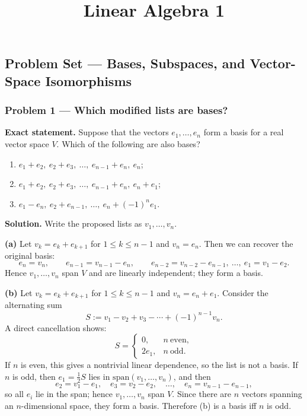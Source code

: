 \documentclass[12pt,a4paper]{article}
\title{Linear Algebra 1}
\author{}
\date{}
\theoremstyle{plain}
\theoremstyle{definition}      %
\begin{document}
	\maketitle

\subsection*{Problem Set — Bases, Subspaces, and Vector-Space Isomorphisms}

\subsubsection*{Problem 1 — Which modified lists are bases?}

\textbf{Exact statement.}
Suppose that the vectors $e_1,\dots,e_n$ form a basis for a real vector space $V$.
Which of the following are also bases?
\begin{enumerate}
	\item[(a)] $e_1+e_2,\ e_2+e_3,\ \dots,\ e_{n-1}+e_n,\ e_n$;
	\item[(b)] $e_1+e_2,\ e_2+e_3,\ \dots,\ e_{n-1}+e_n,\ e_n+e_1$;
	\item[(c)] $e_1-e_n,\ e_2+e_{n-1},\ \dots,\ e_n+(-1)^n e_1$.
\end{enumerate}

\textbf{Solution.}
Write the proposed lists as $v_1,\dots,v_n$.

\medskip
\noindent\textbf{(a)} Let $v_k=e_k+e_{k+1}$ for $1\le k\le n-1$ and $v_n=e_n$.
Then we can recover the original basis:
\[
e_n=v_n,\qquad
e_{n-1}=v_{n-1}-e_n,\qquad
e_{n-2}=v_{n-2}-e_{n-1},\ \dots,\ 
e_1=v_1-e_2.
\]
Hence $v_1,\dots,v_n$ span $V$ and are linearly independent; they form a basis.

\medskip
\noindent\textbf{(b)} Let $v_k=e_k+e_{k+1}$ for $1\le k\le n-1$ and $v_n=e_n+e_1$.
Consider the alternating sum
\[
S:=v_1-v_2+v_3-\cdots+(-1)^{n-1}v_n.
\]
A direct cancellation shows:
\[
S=
\begin{cases}
	0, & n\ \text{even},\\[4pt]
	2e_1, & n\ \text{odd}.
\end{cases}
\]
If $n$ is even, this gives a nontrivial linear dependence, so the list is not a basis.
If $n$ is odd, then $e_1=\tfrac12 S$ lies in $\mathrm{span}(v_1,\dots,v_n)$, and then
\[
e_2=v_1-e_1,\quad e_3=v_2-e_2,\quad \dots,\quad e_n=v_{n-1}-e_{n-1},
\]
so all $e_i$ lie in the span; hence $v_1,\dots,v_n$ span $V$. Since there are $n$ vectors spanning an
$n$-dimensional space, they form a basis. Therefore (b) is a basis iff $n$ is odd.
\end{document}
